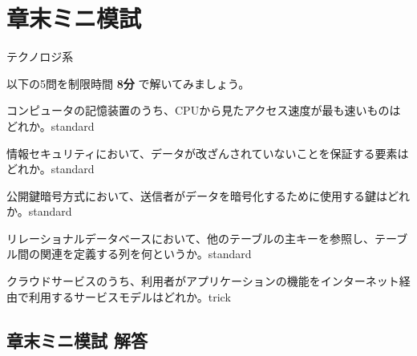 \section*{章末ミニ模試}

\begin{minimoshi}{テクノロジ系}

以下の5問を制限時間 \textbf{8分} で解いてみましょう。

\begin{mondai}{コンピュータの記憶装置のうち、CPUから見たアクセス速度が最も速いものはどれか。}{standard}
\end{mondai}

\begin{mondai}{情報セキュリティにおいて、データが改ざんされていないことを保証する要素はどれか。}{standard}
\end{mondai}

\begin{mondai}{公開鍵暗号方式において、送信者がデータを暗号化するために使用する鍵はどれか。}{standard}
\end{mondai}

\begin{mondai}{リレーショナルデータベースにおいて、他のテーブルの主キーを参照し、テーブル間の関連を定義する列を何というか。}{standard}
\end{mondai}

\begin{mondai}{クラウドサービスのうち、利用者がアプリケーションの機能をインターネット経由で利用するサービスモデルはどれか。}{trick}
\end{mondai}

\end{minimoshi}

\subsection*{章末ミニ模試 解答}

